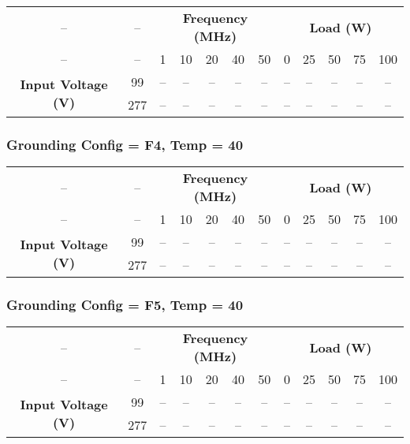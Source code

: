 \begin{center}
\begin{tabular}{cccccccccccc}
-- & -- & \multicolumn{5}{c}{\textbf{Frequency (MHz)}} & \multicolumn{5}{c}{\textbf{Load (W)}} \\
-- & -- & 1 & 10 & 20 & 40 & 50 & 0 & 25 & 50 & 75 & 100 \\
\midrule
\multirow{2}{*}{\textbf{Input Voltage (V)}} & 99 & -- & -- & -- & -- & -- & -- & -- & -- & -- & -- \\
 & 277 & -- & -- & -- & -- & -- & -- & -- & -- & -- & -- \\
\end{tabular}
\end{center}

\vspace{1em}

\subsubsection{Grounding Config = F4, Temp = 40}

\begin{center}
\begin{tabular}{cccccccccccc}
-- & -- & \multicolumn{5}{c}{\textbf{Frequency (MHz)}} & \multicolumn{5}{c}{\textbf{Load (W)}} \\
-- & -- & 1 & 10 & 20 & 40 & 50 & 0 & 25 & 50 & 75 & 100 \\
\midrule
\multirow{2}{*}{\textbf{Input Voltage (V)}} & 99 & -- & -- & -- & -- & -- & -- & -- & -- & -- & -- \\
 & 277 & -- & -- & -- & -- & -- & -- & -- & -- & -- & -- \\
\end{tabular}
\end{center}

\vspace{1em}

\subsubsection{Grounding Config = F5, Temp = 40}

\begin{center}
\begin{tabular}{cccccccccccc}
-- & -- & \multicolumn{5}{c}{\textbf{Frequency (MHz)}} & \multicolumn{5}{c}{\textbf{Load (W)}} \\
-- & -- & 1 & 10 & 20 & 40 & 50 & 0 & 25 & 50 & 75 & 100 \\
\midrule
\multirow{2}{*}{\textbf{Input Voltage (V)}} & 99 & -- & -- & -- & -- & -- & -- & -- & -- & -- & -- \\
 & 277 & -- & -- & -- & -- & -- & -- & -- & -- & -- & -- \\
\end{tabular}
\end{center}

